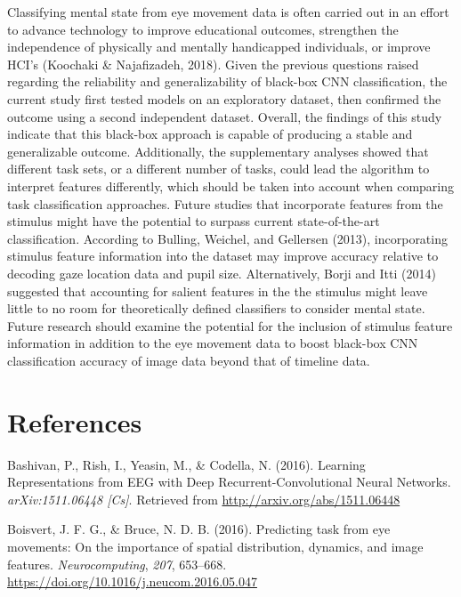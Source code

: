 \documentclass[
  english,
  man, donotrepeattitle,floatsintext]{apa6}
\begin{document}
Classifying mental state from eye movement data is often carried out in an effort to advance technology to improve educational outcomes, strengthen the independence of physically and mentally handicapped individuals, or improve HCI's (Koochaki \& Najafizadeh, 2018). Given the previous questions raised regarding the reliability and generalizability of black-box CNN classification, the current study first tested models on an exploratory dataset, then confirmed the outcome using a second independent dataset. Overall, the findings of this study indicate that this black-box approach is capable of producing a stable and generalizable outcome. Additionally, the supplementary analyses showed that different task sets, or a different number of tasks, could lead the algorithm to interpret features differently, which should be taken into account when comparing task classification approaches. Future studies that incorporate features from the stimulus might have the potential to surpass current state-of-the-art classification. According to Bulling, Weichel, and Gellersen (2013), incorporating stimulus feature information into the dataset may improve accuracy relative to decoding gaze location data and pupil size. Alternatively, Borji and Itti (2014) suggested that accounting for salient features in the the stimulus might leave little to no room for theoretically defined classifiers to consider mental state. Future research should examine the potential for the inclusion of stimulus feature information in addition to the eye movement data to boost black-box CNN classification accuracy of image data beyond that of timeline data.

\newpage

\hypertarget{references}{%
\section{References}\label{references}}

\begingroup
\setlength{\parindent}{-0.5in}
\setlength{\leftskip}{0.5in}

\hypertarget{refs}{}
\leavevmode\hypertarget{ref-bashivanLearningRepresentationsEEG2016}{}%
Bashivan, P., Rish, I., Yeasin, M., \& Codella, N. (2016). Learning Representations from EEG with Deep Recurrent-Convolutional Neural Networks. \emph{arXiv:1511.06448 {[}Cs{]}}. Retrieved from \url{http://arxiv.org/abs/1511.06448}

\leavevmode\hypertarget{ref-boisvertPredictingTaskEye2016a}{}%
Boisvert, J. F. G., \& Bruce, N. D. B. (2016). Predicting task from eye movements: On the importance of spatial distribution, dynamics, and image features. \emph{Neurocomputing}, \emph{207}, 653--668. \url{https://doi.org/10.1016/j.neucom.2016.05.047}
\end{document}
